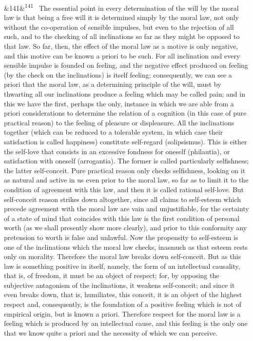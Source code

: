 \documentclass[12pt]{article}
\newcommand{\para}[1][]{\par\noindent\ifx&#1&\else\textsuperscript{\footnotesize #1}~\fi}
\begin{document}
\para[141] The essential point in every determination of the will by the moral law is that being a free will it is determined simply by the moral law, not only without the co-operation of sensible impulses, but even to the rejection of all such, and to the checking of all inclinations so far as they might be opposed to that law. So far, then, the effect of the moral law as a motive is only negative, and this motive can be known a priori to be such. For all inclination and every sensible impulse is founded on feeling, and the negative effect produced on feeling (by the check on the inclinations) is itself feeling; consequently, we can see a priori that the moral law, as a determining principle of the will, must by thwarting all our inclinations produce a feeling which may be called pain; and in this we have the first, perhaps the only, instance in which we are able from a priori considerations to determine the relation of a cognition (in this case of pure practical reason) to the feeling of pleasure or displeasure. All the inclinations together (which can be reduced to a tolerable system, in which case their satisfaction is called happiness) constitute self-regard (solipsismus). This is either the self-love that consists in an excessive fondness for oneself (philautia), or satisfaction with oneself (arrogantia). The former is called particularly selfishness; the latter self-conceit. Pure practical reason only checks selfishness, looking on it as natural and active in us even prior to the moral law, so far as to limit it to the condition of agreement with this law, and then it is called rational self-love. But self-conceit reason strikes down altogether, since all claims to self-esteem which precede agreement with the moral law are vain and unjustifiable, for the certainty of a state of mind that coincides with this law is the first condition of personal worth (as we shall presently show more clearly), and prior to this conformity any pretension to worth is false and unlawful. Now the propensity to self-esteem is one of the inclinations which the moral law checks, inasmuch as that esteem rests only on morality. Therefore the moral law breaks down self-conceit. But as this law is something positive in itself, namely, the form of an intellectual causality, that is, of freedom, it must be an object of respect; for, by opposing the subjective antagonism of the inclinations, it weakens self-conceit; and since it even breaks down, that is, humiliates, this conceit, it is an object of the highest respect and, consequently, is the foundation of a positive feeling which is not of empirical origin, but is known a priori. Therefore respect for the moral law is a feeling which is produced by an intellectual cause, and this feeling is the only one that we know quite a priori and the necessity of which we can perceive.
\end{document}
